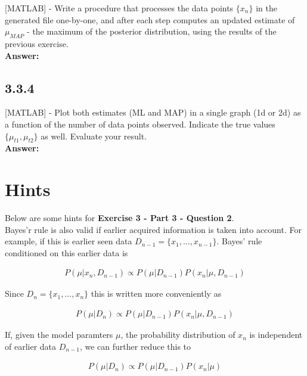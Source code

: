 \documentclass[a4paper]{article}
\begin{document}
[MATLAB] - Write a procedure that processes the data points $\{ x_n\}$ in the generated file one-by-one, and after each step computes an updated estimate of $\mu_{MAP}$ - the maximum of the posterior distribution, using the results of the previous exercise.\\


\textbf{Answer:}\\


\subsection*{3.3.4}

[MATLAB] - Plot both estimates (ML and MAP) in a single graph (1d or 2d) as a function of the number of data points observed. Indicate the true values $\{ \mu_{t1}, \mu_{t2}\}$ as well. Evaluate your result.\\

\textbf{Answer:}\\

\section*{Hints}

Below are some hints for \textbf{Exercise 3 - Part 3 - Question 2}.\\

Bayes'r rule is also valid if earlier acquired information is taken into account. For example, if this is earlier seen data $D_{n - 1} = \{ x_1,..., x_{n - 1}\}$. Bayes' rule conditioned on this earlier data is 

\begin{align*}
	P(\mu | x_n, D_{n - 1}) \propto P(\mu | D_{n - 1}) P(x_n | \mu, D_{n - 1})
\end{align*}

Since $D_n = \{ x_1, ..., x_n\}$ this is written more conveniently as 

\begin{align*}
	P(\mu | D_{n}) \propto P(\mu | D_{n - 1}) P(x_n | \mu, D_{n - 1})
\end{align*}


If, given the model paramters $\mu$, the probability distribution of $x_n$ is independent of earlier data $D_{n - 1}$, we can further reduce this to

\begin{align*}
	P(\mu | D_{n}) \propto P(\mu | D_{n - 1}) P(x_n | \mu)
\end{align*}
\end{document}
